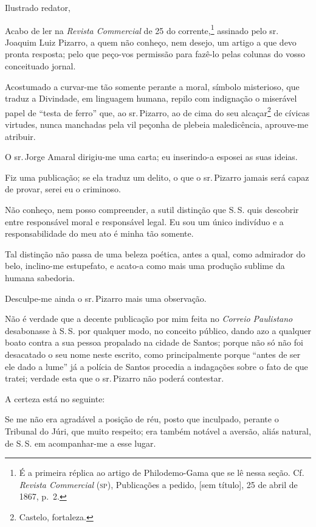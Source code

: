 Ilustrado redator,

Acabo de ler na \emph{Revista Commercial} de 25 do
corrente,\footnote{ É a primeira réplica ao artigo
  de Philodemo-Gama que se lê nessa seção. Cf. \emph{Revista Commercial}
  (\textsc{sp}), Publicações a pedido, {[}sem título{]}, 25 de abril de 1867, p.~2.}
assinado pelo sr.\,Joaquim Luiz Pizarro, a quem não conheço, nem desejo,
um artigo a que devo pronta resposta; pelo que peço-vos permissão para
fazê-lo pelas colunas do vosso conceituado jornal.

Acostumado a curvar-me tão somente perante a moral, símbolo misterioso,
que traduz a Divindade, em linguagem humana, repilo com indignação o
miserável papel de ``testa de ferro'' que, ao sr.\,Pizarro, ao de cima do
seu alcaçar\footnote{Castelo, fortaleza.} de cívicas
virtudes, nunca manchadas pela vil peçonha de plebeia maledicência,
aprouve-me atribuir.

O sr.\,Jorge Amaral dirigiu-me uma carta; eu inserindo-a esposei as suas
ideias.

Fiz uma publicação; se ela traduz um delito, o que o sr.\,Pizarro jamais
será capaz de provar, serei eu o criminoso.

Não conheço, nem posso compreender, a sutil distinção que S.\,S. quis
descobrir entre responsável moral e responsável legal. Eu sou um único
indivíduo e a responsabilidade do meu ato é minha tão somente.

Tal distinção não passa de uma beleza poética, antes a qual, como
admirador do belo, inclino-me estupefato, e acato-a como mais uma
produção sublime da humana sabedoria.

Desculpe-me ainda o sr.\,Pizarro mais uma observação.

Não é verdade que a decente publicação por mim feita no \emph{Correio
Paulistano} desabonasse à S.\,S. por qualquer modo, no conceito público,
dando azo a qualquer boato contra a sua pessoa propalado na cidade de
Santos; porque não só não foi desacatado o seu nome neste escrito, como
principalmente porque ``antes de ser ele dado a lume'' já a polícia de
Santos procedia a indagações sobre o fato de que tratei; verdade esta
que o sr.\,Pizarro não poderá contestar.

A certeza está no seguinte:

Se me não era agradável a posição de réu, posto que inculpado, perante o
Tribunal do Júri, que muito respeito; era também notável a aversão,
aliás natural, de S.\,S. em acompanhar-me a esse lugar.

